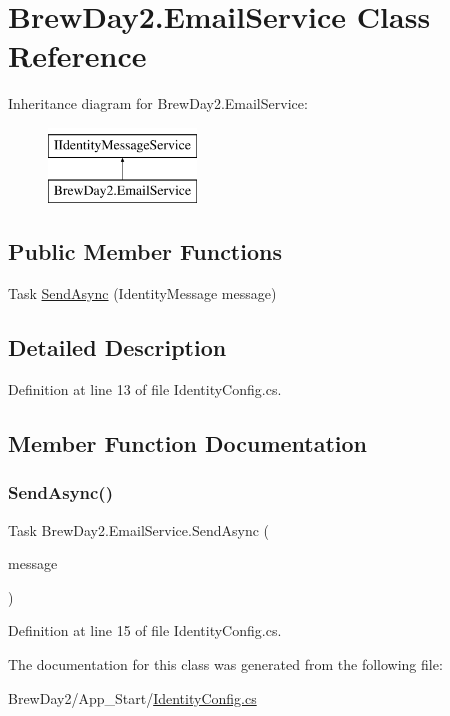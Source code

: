 \hypertarget{class_brew_day2_1_1_email_service}{}\section{Brew\+Day2.\+Email\+Service Class Reference}
\label{class_brew_day2_1_1_email_service}
Inheritance diagram for Brew\+Day2.\+Email\+Service\+:\begin{figure}[H]
\begin{center}
\leavevmode
\includegraphics[height=2.000000cm]{class_brew_day2_1_1_email_service}
\end{center}
\end{figure}
\subsection*{Public Member Functions}
\begin{DoxyCompactItemize}
\item 
Task \mbox{\hyperlink{class_brew_day2_1_1_email_service_ae3dee84691fcd978c494f50a2b495b17}{Send\+Async}} (Identity\+Message message)
\end{DoxyCompactItemize}


\subsection{Detailed Description}


Definition at line 13 of file Identity\+Config.\+cs.



\subsection{Member Function Documentation}
\mbox{\label{class_brew_day2_1_1_email_service_ae3dee84691fcd978c494f50a2b495b17}} 
\subsubsection{\texorpdfstring{Send\+Async()}{SendAsync()}}
{\footnotesize\ttfamily Task Brew\+Day2.\+Email\+Service.\+Send\+Async (\begin{DoxyParamCaption}\item[{Identity\+Message}]{message }\end{DoxyParamCaption})}



Definition at line 15 of file Identity\+Config.\+cs.



The documentation for this class was generated from the following file\+:\begin{DoxyCompactItemize}
\item 
Brew\+Day2/\+App\+\_\+\+Start/\mbox{\hyperlink{_identity_config_8cs}{Identity\+Config.\+cs}}\end{DoxyCompactItemize}

